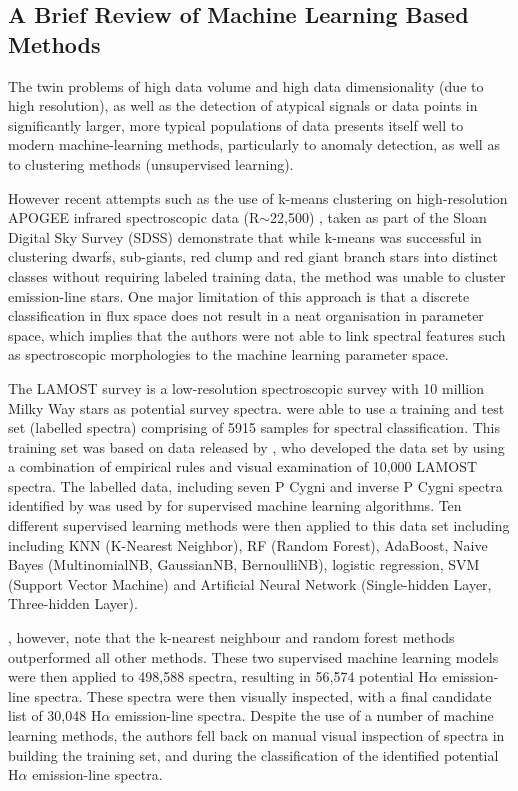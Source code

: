 \documentclass[fleqn,usenatbib]{mnras}
\begin{document}
\subsection{A Brief Review of Machine Learning Based Methods}

The twin problems of high data volume and high data dimensionality (due to high resolution), as well as the detection of atypical signals or data points in significantly larger, more typical populations of data presents itself well to modern machine-learning methods, particularly to anomaly detection, as well as to clustering methods (unsupervised learning). 

However recent attempts such as the use of k-means clustering on high-resolution APOGEE infrared spectroscopic data (R$\sim$22,500) \citep{garcia2018machine}, taken as part of the Sloan Digital Sky Survey (SDSS) \citep{eisenstein2001spectroscopic, blanton2017sloan} demonstrate that while k-means was successful in clustering dwarfs, sub-giants, red clump and red giant branch stars into distinct classes without requiring labeled training data, the method was unable to cluster emission-line stars. One major limitation of this approach is that a discrete classification in flux space does not result in a neat organisation in parameter space, which implies that the authors were not able to link spectral features such as spectroscopic morphologies to the machine learning parameter space. 

The LAMOST survey is a low-resolution spectroscopic survey with 10 million Milky Way stars as potential survey spectra. \citet{zhang2021catalog} were able to use a training and test set (labelled spectra) comprising of 5915 samples for spectral classification. This training set was based on data released by \citet{hou2016catalog}, who developed the data set by using a combination of empirical rules and visual examination of 10,000 LAMOST spectra. The labelled data, including seven P Cygni and inverse P Cygni spectra identified by \citeauthor{hou2016catalog} was used by \citeauthor{zhang2021catalog} for supervised machine learning algorithms. Ten different supervised learning methods were then applied to this data set including including KNN (K-Nearest Neighbor), RF (Random Forest), AdaBoost, Naive Bayes (MultinomialNB, GaussianNB, BernoulliNB), logistic regression, SVM (Support Vector Machine) and Artificial Neural Network (Single-hidden Layer, Three-hidden Layer).

\citeauthor{zhang2021catalog}, however, note that the k-nearest neighbour and random forest methods outperformed all other methods. These two supervised machine learning models were then applied to 498,588 spectra, resulting in 56,574 potential H$\alpha$ emission-line spectra. These spectra were then visually inspected, with a final candidate list of 30,048 H$\alpha$ emission-line spectra. Despite the use of a number of machine learning methods, the authors fell back on manual visual inspection of spectra in building the training set, and during the classification of the identified potential H$\alpha$ emission-line spectra. 
\end{document}
